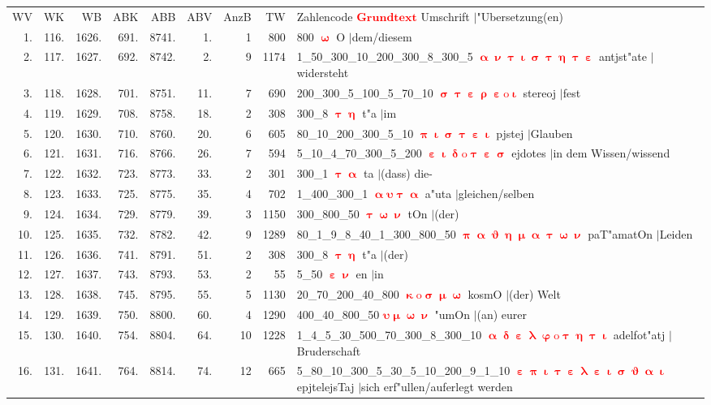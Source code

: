 \documentclass[a4paper,10pt,landscape]{article}
\begin{document}
\begin{tabular}{rrrrrrrrp{120mm}}
WV&WK&WB&ABK&ABB&ABV&AnzB&TW&Zahlencode \textcolor{red}{$\boldsymbol{Grundtext}$} Umschrift $|$"Ubersetzung(en)\\
1.&116.&1626.&691.&8741.&1.&1&800&800 \textcolor{red}{$\boldsymbol{\upomega}$} O $|$dem/diesem\\
2.&117.&1627.&692.&8742.&2.&9&1174&1\_50\_300\_10\_200\_300\_8\_300\_5 \textcolor{red}{$\boldsymbol{\upalpha\upnu\uptau\upiota\upsigma\uptau\upeta\uptau\upepsilon}$} antjst"ate $|$widersteht\\
3.&118.&1628.&701.&8751.&11.&7&690&200\_300\_5\_100\_5\_70\_10 \textcolor{red}{$\boldsymbol{\upsigma\uptau\upepsilon\uprho\upepsilon\mathrm{o}\upiota}$} stereoj $|$fest\\
4.&119.&1629.&708.&8758.&18.&2&308&300\_8 \textcolor{red}{$\boldsymbol{\uptau\upeta}$} t"a $|$im\\
5.&120.&1630.&710.&8760.&20.&6&605&80\_10\_200\_300\_5\_10 \textcolor{red}{$\boldsymbol{\uppi\upiota\upsigma\uptau\upepsilon\upiota}$} pjstej $|$Glauben\\
6.&121.&1631.&716.&8766.&26.&7&594&5\_10\_4\_70\_300\_5\_200 \textcolor{red}{$\boldsymbol{\upepsilon\upiota\updelta\mathrm{o}\uptau\upepsilon\upsigma}$} ejdotes $|$in dem Wissen/wissend\\
7.&122.&1632.&723.&8773.&33.&2&301&300\_1 \textcolor{red}{$\boldsymbol{\uptau\upalpha}$} ta $|$(dass) die-\\
8.&123.&1633.&725.&8775.&35.&4&702&1\_400\_300\_1 \textcolor{red}{$\boldsymbol{\upalpha\upsilon\uptau\upalpha}$} a"uta $|$gleichen/selben\\
9.&124.&1634.&729.&8779.&39.&3&1150&300\_800\_50 \textcolor{red}{$\boldsymbol{\uptau\upomega\upnu}$} tOn $|$(der)\\
10.&125.&1635.&732.&8782.&42.&9&1289&80\_1\_9\_8\_40\_1\_300\_800\_50 \textcolor{red}{$\boldsymbol{\uppi\upalpha\upvartheta\upeta\upmu\upalpha\uptau\upomega\upnu}$} paT"amatOn $|$Leiden\\
11.&126.&1636.&741.&8791.&51.&2&308&300\_8 \textcolor{red}{$\boldsymbol{\uptau\upeta}$} t"a $|$(der)\\
12.&127.&1637.&743.&8793.&53.&2&55&5\_50 \textcolor{red}{$\boldsymbol{\upepsilon\upnu}$} en $|$in\\
13.&128.&1638.&745.&8795.&55.&5&1130&20\_70\_200\_40\_800 \textcolor{red}{$\boldsymbol{\upkappa\mathrm{o}\upsigma\upmu\upomega}$} kosmO $|$(der) Welt\\
14.&129.&1639.&750.&8800.&60.&4&1290&400\_40\_800\_50 \textcolor{red}{$\boldsymbol{\upsilon\upmu\upomega\upnu}$} "umOn $|$(an) eurer\\
15.&130.&1640.&754.&8804.&64.&10&1228&1\_4\_5\_30\_500\_70\_300\_8\_300\_10 \textcolor{red}{$\boldsymbol{\upalpha\updelta\upepsilon\uplambda\upvarphi\mathrm{o}\uptau\upeta\uptau\upiota}$} adelfot"atj $|$Bruderschaft\\
16.&131.&1641.&764.&8814.&74.&12&665&5\_80\_10\_300\_5\_30\_5\_10\_200\_9\_1\_10 \textcolor{red}{$\boldsymbol{\upepsilon\uppi\upiota\uptau\upepsilon\uplambda\upepsilon\upiota\upsigma\upvartheta\upalpha\upiota}$} epjtelejsTaj $|$sich erf"ullen/auferlegt werden\\
\end{tabular}\medskip \\
\end{document}
